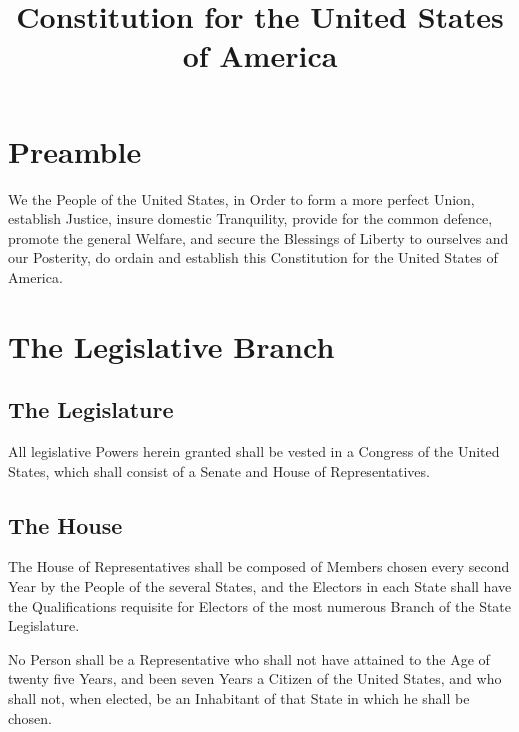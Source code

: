 \documentclass{constitution}
\title{Constitution for the United States of America}
\begin{document}
\maketitle
\tableofcontents*

\newpage
\maketitle
\chapter*{Preamble}
We the People of the United States,
in Order to form a more perfect Union, establish Justice,
insure domestic Tranquility, provide for the common defence,
promote the general Welfare,
and secure the Blessings of Liberty to ourselves and our Posterity,
do ordain and establish this Constitution for the United States of America.

\chapter{The Legislative Branch}
\section{The Legislature}
All legislative Powers herein granted shall be vested in a Congress of the United States,
which shall consist of a Senate and House of Representatives.

\section{The House}
The House of Representatives shall be composed of Members
chosen every second Year by the People of the several States,
and the Electors in each State shall have the Qualifications
requisite for Electors of the most numerous Branch of the State Legislature.

No Person shall be a Representative who shall not have attained to the Age of twenty five Years,
and been seven Years a Citizen of the United States,
and who shall not, when elected, be an Inhabitant of that State in which he shall be chosen.
\end{document}
